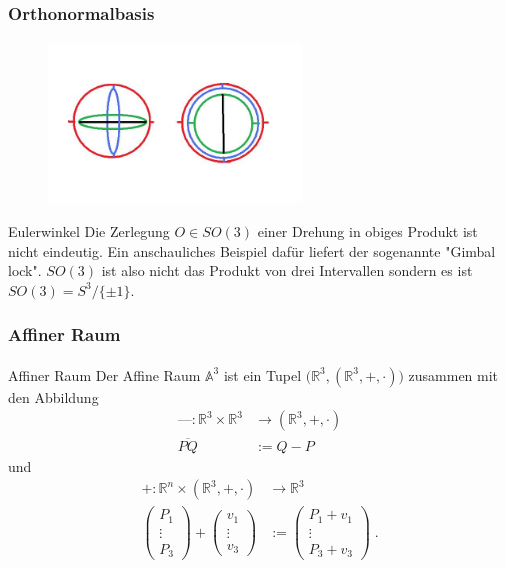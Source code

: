 \documentclass{beamer}
\begin{document}
\begin{frame}
    \frametitle{Orthonormalbasis}
\framesubtitle{}
\begin{figure}[H]
    \centering
    \includegraphics[width=0.6\textwidth]{images/gimbalLock.jpg}

\end{figure}
\begin{block}{Eulerwinkel}
Die  Zerlegung  $O \in SO(3)$  einer Drehung in obiges Produkt ist  nicht eindeutig.
Ein anschauliches Beispiel dafür liefert der sogenannte "Gimbal lock". $SO(3)$ ist also nicht das Produkt von drei Intervallen sondern
es ist $SO(3) = S^{3}/ \{ \pm 1 \}$.



\end{block}

\end{frame}


\begin{frame}
    \frametitle{Affiner Raum}
\framesubtitle{}
\begin{block}{Affiner Raum}
Der Affine Raum $\mathbb{A}^3$ ist ein Tupel $\bigl( \mathbb{R}^3, (\mathbb{R}^3, + , \cdot ) \bigr )$
zusammen mit den Abbildung 
\begin{align*}
\text{---} : \mathbb{R}^3 \times \mathbb{R}^3  & \to (\mathbb{R}^3, + , \cdot ) \\
\overline{PQ} & := Q-P  
\end{align*}
und
\begin{align*}
+ : \mathbb{R}^n \times (\mathbb{R}^3, + , \cdot )   & \to  \mathbb{R}^3\\
\begin{pmatrix}
P_1 \\ \vdots \\ P_3
\end{pmatrix} + \begin{pmatrix}
v_1 \\ \vdots \\ v_3
\end{pmatrix} & := \begin{pmatrix}
P_1  + v_1 \\ \vdots \\ P_3 + v_3
\end{pmatrix}   \;.
\end{align*}

\end{block}

\end{frame}
\end{document}
